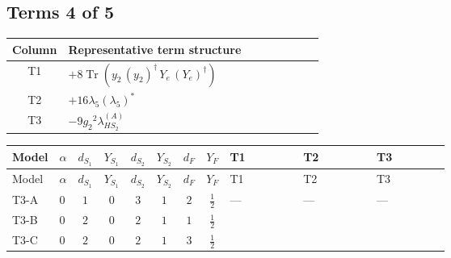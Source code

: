 \documentclass[8pt]{article}
\begin{document}
\begin{landscape}
\subsection*{Terms 4 of 5}
\begin{center}
\begin{tabular}{@{}c >{\raggedright\arraybackslash}p{0.82\linewidth}@{}}
\toprule
Column & Representative term structure \\
\midrule
T1 & \(\displaystyle +8 \operatorname{Tr}\!\left({y_2}\,\left({y_2}\right)^{\dagger}\,{Y_e}\,\left({Y_e}\right)^{\dagger}\right)\) \\
\midrule
T2 & \(\displaystyle +16 {\lambda_5} \left({\lambda_5}\right)^{*}\) \\
\midrule
T3 & \(\displaystyle -9 {g_2}^2 {\lambda_{HS_2}^{(A)}}\) \\
\midrule
\bottomrule
\end{tabular}
\end{center}
\smallskip
\tiny
\begin{longtable}{@{}llcccccc >{\raggedright\arraybackslash}p{0.21\linewidth} >{\raggedright\arraybackslash}p{0.21\linewidth} >{\raggedright\arraybackslash}p{0.21\linewidth}@{}}
\toprule
Model & $\alpha$ & $d_{S_1}$ & $Y_{S_1}$ & $d_{S_2}$ & $Y_{S_2}$ & $d_F$ & $Y_F$ & T1 & T2 & T3 \\
\midrule
\endfirsthead
\toprule
Model & $\alpha$ & $d_{S_1}$ & $Y_{S_1}$ & $d_{S_2}$ & $Y_{S_2}$ & $d_F$ & $Y_F$ & T1 & T2 & T3 \\
\midrule
\endhead
T3-A & $0$ & $1$ & $0$ & $3$ & $1$ & $2$ & $\frac{1}{2}$ & --- & --- & --- \\
\midrule
T3-B & $0$ & $2$ & $0$ & $2$ & $1$ & $1$ & $\frac{1}{2}$ & \scriptsize\adjustbox{max width=\linewidth}{$\begin{gathered} +8 \operatorname{Tr}\!\left({y_2}\,\left({y_2}\right)^{\dagger}\,{Y_e}\,\left({Y_e}\right)^{\dagger}\right)\end{gathered}$} & \scriptsize\adjustbox{max width=\linewidth}{$\begin{gathered} +16 {\lambda_5} \left({\lambda_5}\right)^{*}\end{gathered}$} & \scriptsize\adjustbox{max width=\linewidth}{$\begin{gathered} -9 {g_2}^2 {\lambda_{HS_2}^{(A)}}\end{gathered}$} \\
\midrule
T3-C & $0$ & $2$ & $0$ & $2$ & $1$ & $3$ & $\frac{1}{2}$ & \scriptsize\adjustbox{max width=\linewidth}{$\begin{gathered} -4 \operatorname{Tr}\!\left({y_2}\,\left({y_2}\right)^{\dagger}\,{Y_e}\,\left({Y_e}\right)^{\dagger}\right)\end{gathered}$} & \scriptsize\adjustbox{max width=\linewidth}{$\begin{gathered} +16 {\lambda_5} \left({\lambda_5}\right)^{*}\end{gathered}$} & \scriptsize\adjustbox{max width=\linewidth}{$\begin{gathered} -9 {g_2}^2 {\lambda_{HS_2}^{(A)}}\end{gathered}$} \\

\end{longtable}
\end{landscape}
\end{document}
